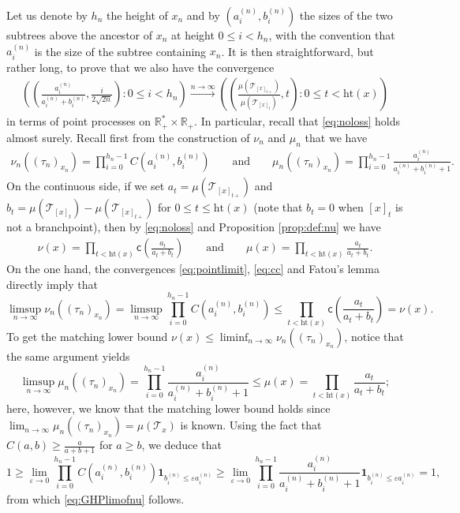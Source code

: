 \documentclass[11pt]{article}
\newcommand{\T}{\mathcal{T}}
\renewcommand{\geq}{\geqslant}
\renewcommand{\leq}{\leqslant}
\begin{document}
Let us denote by $h_n$ the height of $x_n$ and by $(a^{(n)}_i,b^{(n)}_i)$ the sizes of the two subtrees above the ancestor of $x_n$ at height $0\leq i < h_n$, with the convention that $a^{(n)}_i$ is the size of the subtree containing $x_n$. It is then straightforward, but rather long, to prove that we also have the convergence 
\begin{eqnarray} \label{eq:pointlimit} \left( \left(\frac{a_i^{(n)}}{a_i^{(n)}+b_i^{(n)}} , \frac{i}{ 2\sqrt{2n}}\right) : 0 \leq i < h_n\right) \xrightarrow[]{n \to \infty} \left( \left(\frac{\mu(\T_{[x]_{t+}})}{\mu(\T_{[x]_{t}})},t\right) : 0 \leq t < \mathrm{ht}(x)\right) \end{eqnarray}
in terms of point processes on $ \mathbb{R}_+^* \times \mathbb{R}_+$. In particular, recall that \eqref{eq:noloss} holds almost surely.
Recall first from the construction of $\nu_n$ and $\mu_n$ that we have 
\begin{eqnarray} \label{rappelnun} \nu_n( (\tau_n)_{x_n}) = \prod_{i=0}^{h_n-1} C(a_i^{(n)}, b_i^{(n)})  \qquad \mbox{and} \qquad \mu_n( (\tau_n)_{x_n}) = \prod_{i=0}^{h_n-1} \frac{a_i^{(n)}}{a_i^{(n)}+b_i^{(n)}+1}. \end{eqnarray}
On the continuous side, if we set  $a_t = \mu(\T_{[x]_{t+}})$ and $b_t = \mu(\T_{[x]_{t}})-\mu(\T_{[x]_{t+}})$ for $0 \leq t \leq \mathrm{ht}(x)$ (note that $b_t=0$ when $[x]_t$ is not a branchpoint), then by \eqref{eq:noloss} and Proposition \ref{prop:def:nu} we have 
\begin{eqnarray} \label{rappelnu}\nu(x) = \prod_{t <  \mathrm{ht}(x)}  \mathsf{c}(\frac{a_t}{a_t+b_t}) \qquad \mbox{and} \qquad \mu(x) = \prod_{t < \mathrm{ht}(x)}  \frac{a_t}{a_t+b_t}. \end{eqnarray}
On the one hand, the convergences \eqref{eq:pointlimit}, \eqref{eq:cc} and Fatou's lemma directly imply that 
$$ \limsup_{n \to \infty} \nu_n( (\tau_n)_{x_n}) =  \limsup_{n \to \infty}\prod_{i=0}^{h_n-1} C(a_i^{(n)}, b_i^{(n)}) \leq  \prod_{t < \mathrm{ht}(x)}  \mathsf{c}(\frac{a_t}{a_t+b_t}) =\nu(x).$$
To get the matching lower bound $\nu(x)\leq \liminf_{n \to \infty} \nu_n( (\tau_n)_{x_n})$, notice that the same argument yields 
$$ \limsup_{n \to \infty} \mu_n( (\tau_n)_{x_n}) = \prod_{i=0}^{h_n-1} \frac{a_i^{(n)}}{a_i^{(n)}+b_i^{(n)}+1} \leq \mu(x) = \prod_{t < \mathrm{ht}(x)}  \frac{a_t}{a_t+b_t};$$ here, however, we know that the matching lower bound holds since $\lim_{n \to \infty} \mu_n( (\tau_n)_{x_n}) = \mu( \mathcal{T}_x)$ is known.  Using the fact that $C(a,b) \geq \frac{a}{a+b+1}$ for $a \geq b$, we deduce that 
$$ 1\geq \lim_{\varepsilon \to 0} \prod_{i=0}^{h_n-1} C(a_i^{(n)}, b_i^{(n)})\mathbf{1}_{b_i^{(n)} \leq \varepsilon a_i^{(n)}} \geq \lim_{\varepsilon \to 0} \prod_{i=0}^{h_n-1} \frac{a_i^{(n)}}{a_i^{(n)}+b_i^{(n)}+1}\mathbf{1}_{b_i^{(n)} \leq \varepsilon a_i^{(n)}} = 1,$$
from which \eqref{eq:GHPlimofnu} follows.
\end{document}
